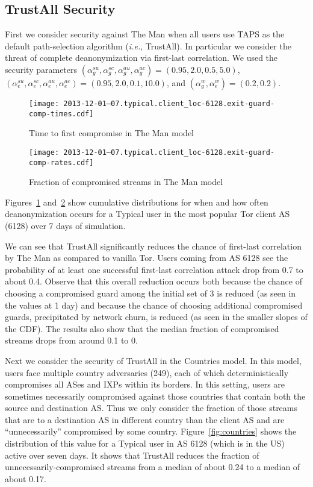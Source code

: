 \documentclass[conference]{styles/IEEEtran}
\newcommand{\ie}{\emph{i.e.}}
\newcommand{\ps}{TAPS\xspace}
\begin{document}
\subsection{TrustAll Security} \label{subsec:sec:trustall}
First we consider security against \textsf{The Man} when all users use \ps as the default
path-selection
algorithm (\ie{}, TrustAll). In particular we consider the threat of complete deanonymization via 
first-last correlation. We used the security parameters
$(\alpha^{su}_g, \alpha^{sc}_g, \alpha^{au}_g, \alpha^{ac}_g) = (0.95, 2.0, 0.5, 5.0)$,
$(\alpha^{su}_e, \alpha^{sc}_e, \alpha^{au}_e, \alpha^{ac}_e) = (0.95, 2.0, 0.1, 10.0)$, and
$(\alpha^w_g, \alpha^w_e) = (0.2, 0.2)$.
\begin{figure}[t]
\texttt{[image: 2013-12-01--07.typical.client\_loc-6128.exit-guard-comp-times.cdf]}
\vspace{-4mm}
\caption{\small Time to first compromise in \textsf{The Man} model}
\vspace{-4mm}
\label{fig:the-man-time.cdf}
\end{figure}
\begin{figure}[t]
\texttt{[image: 2013-12-01--07.typical.client\_loc-6128.exit-guard-comp-rates.cdf]}
\vspace{-4mm}
\caption{\small Fraction of compromised streams in \textsf{The Man} model}
\vspace{-4mm}
\label{fig:the-man-rate.cdf}
\end{figure}
Figures~\ref{fig:the-man-time.cdf} and~\ref{fig:the-man-rate.cdf} show cumulative distributions for
when and how often deanonymization occurs for a Typical user in the most popular Tor client AS
(6128) over 7 days of simulation.

We can see that TrustAll significantly reduces the chance of first-last correlation by
\textsf{The Man} as compared to vanilla Tor. Users coming from AS 6128 see the probability of at
least one successful first-last correlation attack drop from 0.7 to about 0.4. Observe that this
overall reduction occurs both because the chance of choosing a compromised guard among the initial
set of 3 is reduced (as seen in the values at 1 day) and because the chance of choosing additional 
compromised guards, precipitated by network churn, is reduced (as seen in the smaller slopes
of the CDF). The results also show that the median fraction of compromised streams drops from
around 0.1 to 0.

Next we consider the security of TrustAll in the \textsf{Countries} model. In this model, users
face multiple country adversaries (249), each of which deterministically compromises all ASes and
IXPs within its borders. In this setting, users are sometimes necessarily compromised against those
countries that contain both the source and destination AS. Thus we only consider the fraction of
those streams that are to a destination AS in different country than the client AS and are
``unnecessarily'' compromised by some country. Figure~\ref{fig:countries}
shows the distribution of this value for a Typical user in AS 6128 (which is in the US)
active over seven days. It shows that TrustAll reduces the fraction
of unnecessarily-compromised streams from a median of about 0.24 to a median of about 0.17.
\end{document}
